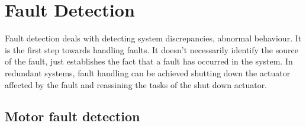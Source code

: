 \section{Fault Detection}

Fault detection deals with detecting system discrepancies, abnormal behaviour. It is the first step towards handling faults. It doesn't necessarily identify the source of the fault, just establishes the fact that a fault has occurred in the system. In redundant systems, fault handling can be achieved shutting down the actuator affected by the fault and reassining the tasks of the shut down actuator.


\subsection{Motor fault detection}















